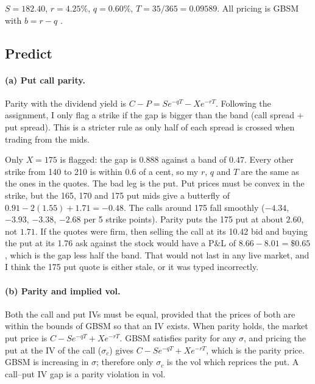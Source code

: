 \documentclass[11pt]{article}
\newcommand{\tbl}[1]{}
\begin{document}
$S=182.40$, $r=4.25\%$, $q=0.60\%$, $T=35/365=0.09589$. All pricing is GBSM with $b=r-q$ \citep{merton1973theory,pazzula2026notes}.

\subsection*{Predict}

\paragraph{(a) Put call parity.} Parity with the dividend yield is $C-P=Se^{-qT}-Xe^{-rT}$. Following the assignment, I only flag a strike if the gap is bigger than the band (call spread + put spread). This is a stricter rule as only half of each spread is crossed when trading from the mids.

\begin{table}[H]
\centering\small
\caption{Put call parity on mids. Gap $=(C_{mid}-P_{mid})-(Se^{-qT}-Xe^{-rT})$; Band = call spread + put spread.}
\label{tab:p1parity}
\tbl{p1_parity}
\end{table}

Only $X=175$ is flagged: the gap is $0.888$ against a band of $0.47$. Every other strike from 140 to 210 is within 0.6 of a cent, so my $r$, $q$ and $T$ are the same as the ones in the quotes. The bad leg is the put. Put prices must be convex in the strike, but the 165, 170 and 175 put mids give a butterfly of $0.91-2(1.55)+1.71=-0.48$. The calls around 175 fall smoothly ($-4.34$, $-3.93$, $-3.38$, $-2.68$ per 5 strike points). Parity puts the 175 put at about $2.60$, not $1.71$. If the quotes were firm, then selling the call at its 10.42 bid and buying the put at its 1.76 ask against the stock would have a P\&L of $8.66-8.01=\$0.65$, which is the gap less half the band. That would not last in any live market, and I think the 175 put quote is either stale, or it was typed incorrectly.

\paragraph{(b) Parity and implied vol.} Both the call and put IVs must be equal, provided that the prices of both are within the bounds of GBSM so that an IV exists. When parity holds, the market put price is $C-Se^{-qT}+Xe^{-rT}$. GBSM satisfies parity for any $\sigma$, and pricing the put at the IV of the call ($\sigma_c$) gives $C-Se^{-qT}+Xe^{-rT}$, which is the parity price. GBSM is increasing in $\sigma$; therefore only $\sigma_c$ is the vol which reprices the put. A call--put IV gap is a parity violation in vol.
\end{document}
